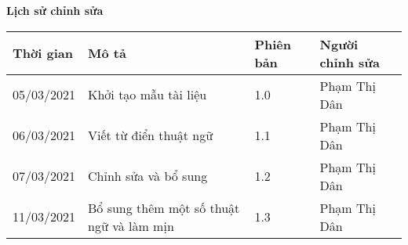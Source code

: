 \documentclass[./main.tex]{subfiles}
\begin{document}
\begin{center}
	\Large{\textbf{Lịch sử chỉnh sửa}}
	\begin{table}[H]
		\begin{tabular}{|p{}|p{}|p{}|p{}|}
			\hline
			\textbf{Thời gian} & \textbf{Mô tả}                           & \textbf{Phiên bản} & \textbf{Người chỉnh sửa} \\ \hline
			05/03/2021         & Khởi tạo mẫu tài liệu                    & 1.0                & Phạm Thị Dân             \\ \hline
			06/03/2021         & Viết từ điển thuật ngữ                   & 1.1                & Phạm Thị Dân             \\ \hline
			07/03/2021         & Chỉnh sửa và bổ sung                     & 1.2                & Phạm Thị Dân             \\ \hline
			11/03/2021         & Bổ sung thêm một số thuật ngữ và làm mịn & 1.3                & Phạm Thị Dân             \\ \hline
		\end{tabular}
	\end{table}
\end{center}
\end{document}
